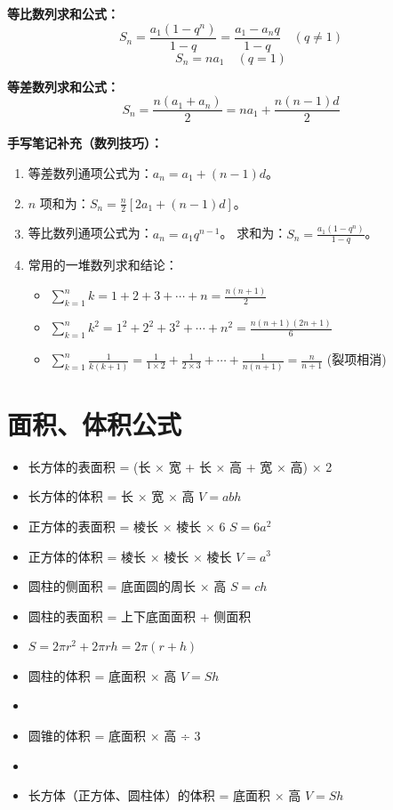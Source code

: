 \documentclass[a4paper,12pt]{ctexart}
\begin{document}
\textbf{等比数列求和公式：}
\[ S_n = \frac{a_1(1-q^n)}{1-q} = \frac{a_1 - a_n q}{1-q} \quad (q \neq 1) \]
\[ S_n = n a_1 \quad (q = 1) \]

\textbf{等差数列求和公式：}
\[ S_n = \frac{n(a_1 + a_n)}{2} = n a_1 + \frac{n(n-1)d}{2} \]

\vspace{0.5cm}
\noindent\textbf{手写笔记补充（数列技巧）：}
\begin{enumerate}
    \item 等差数列通项公式为：$a_n = a_1 + (n-1)d$。
    \item $n$ 项和为：$S_n = \frac{n}{2}[2a_1 + (n-1)d]$。
    \item 等比数列通项公式为：$a_n = a_1 q^{n-1}$。
          求和为：$S_n = \frac{a_1(1-q^n)}{1-q}$。
    \item 常用的一堆数列求和结论：
          \begin{itemize}
              \item $\sum_{k=1}^n k = 1 + 2 + 3 + \cdots + n = \frac{n(n+1)}{2}$
              \item $\sum_{k=1}^n k^2 = 1^2 + 2^2 + 3^2 + \cdots + n^2 = \frac{n(n+1)(2n+1)}{6}$
              \item $\sum_{k=1}^n \frac{1}{k(k+1)} = \frac{1}{1\times 2} + \frac{1}{2\times 3} + \cdots + \frac{1}{n(n+1)} = \frac{n}{n+1}$ (裂项相消)
          \end{itemize}
\end{enumerate}

\section*{面积、体积公式}

\begin{itemize}
    \item 长方体的表面积 = (长 × 宽 + 长 × 高 + 宽 × 高) × 2
    \item 长方体的体积 = 长 × 宽 × 高 \quad $V = abh$
    \item 正方体的表面积 = 棱长 × 棱长 × 6 \quad $S = 6a^2$
    \item 正方体的体积 = 棱长 × 棱长 × 棱长 \quad $V = a^3$
    \item 圆柱的侧面积 = 底面圆的周长 × 高 \quad $S = ch$
    \item 圆柱的表面积 = 上下底面面积 + 侧面积
    \item $S = 2\pi r^2 + 2\pi rh = 2\pi(r+h)$
    \item 圆柱的体积 = 底面积 × 高 \quad $V = Sh$
    \item {}
    \item 圆锥的体积 = 底面积 × 高 ÷ 3
    \item {}
    \item 长方体（正方体、圆柱体）的体积 = 底面积 × 高 \quad $V = Sh$
\end{itemize}
\end{document}
